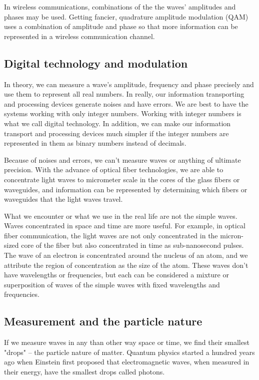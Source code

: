 \documentclass{book}
\begin{document}
In wireless communications, combinations of the the waves' amplitudes and phases may be used. Getting fancier, quadrature amplitude modulation (QAM) uses a combination of amplitude and phase so that more information can be represented in a wireless communication channel.

\subsection{Digital technology and modulation}
In theory, we can measure a wave's amplitude, frequency and phase precisely and use them to represent all real numbers. In really, our information transporting and processing devices generate noises and have errors. We are best to have the systems working with only integer numbers. Working with integer numbers is what we call digital technology. In addition, we can make our information transport and processing devices much simpler if the integer numbers are represented in them as binary numbers instead of decimals.


Because of noises and errors, we can't measure waves or anything of ultimate precision. 
With the advance of optical fiber technologies, we are able to concentrate light waves to micrometer scale in the cores of the glass fibers or waveguides, and information can be represented by determining which fibers or waveguides that the light waves travel.

What we encounter or what we use in the real life are not the simple waves. Waves concentrated in space and time are more useful. For example, in optical fiber communication, the light waves are not only concentrated in the micron-sized core of the fiber but also concentrated in time as sub-nanosecond pulses. The wave of an electron is concentrated around the nucleus of an atom, and we attribute the region of concentration as the size of the atom. These waves don't have wavelengths or frequencies, but each can be considered a mixture or superposition of waves of the simple waves with fixed wavelengths and frequencies.

\subsection{Measurement and the particle nature}
If we measure waves in any than other way space or time, we find their smallest "drops" -- the particle nature of matter. Quantum physics started a hundred years ago when Einstein first proposed that electromagnetic waves, when measured in their energy, have the smallest drops called photons.
\end{document}
